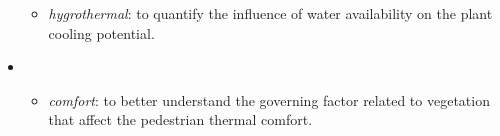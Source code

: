 \begin{itemize}
\begin{itemize}
			\item \textit{hygrothermal}: to quantify the influence of water availability on the plant cooling potential.
		\end{itemize}
	\item {}
		\begin{itemize}
			\item \textit{comfort}: to better understand the governing factor related to vegetation that affect the pedestrian thermal comfort. 				
		\end{itemize}
\end{itemize}




